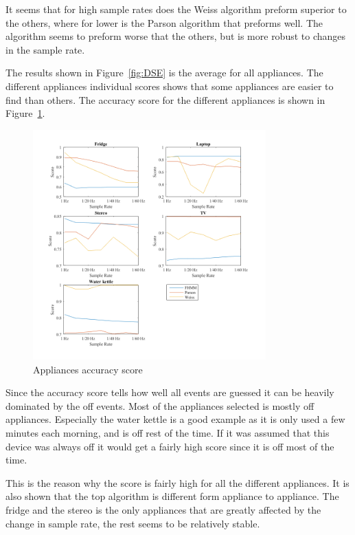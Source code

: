 It seems that for high sample rates does the Weiss algorithm preform superior to the others, where for lower is the Parson algorithm that preforms well. The  algorithm seems to preform worse that the others, but is more robust to changes in the sample rate. 

The results shown in Figure~\ref{fig:DSE} is the average for all appliances. The different appliances individual scores shows that some appliances are easier to find than others. The accuracy score for the different appliances is shown in Figure~\ref{fig:AccGS}. 

\begin{figure}[H]
\centering
\includegraphics[width=0.8\textwidth]{billeder/App-AccuracyScore.png}
\caption{Appliances accuracy score}
\label{fig:AccGS}
\end{figure}

Since the accuracy score tells how well all events are guessed it can be heavily dominated by the off events. Most of the appliances selected is mostly off appliances. Especially the water kettle is a good example as it is only used a few minutes each morning, and is off rest of the time. If it was assumed that this device was always off it would get a fairly high score since it is off most of the time.  

This is the reason why the score is fairly high for all the different appliances. It is also shown that the top algorithm is different form appliance to appliance. The fridge and the stereo is the only appliances that are greatly affected by the change in sample rate, the rest seems to be  relatively stable.

